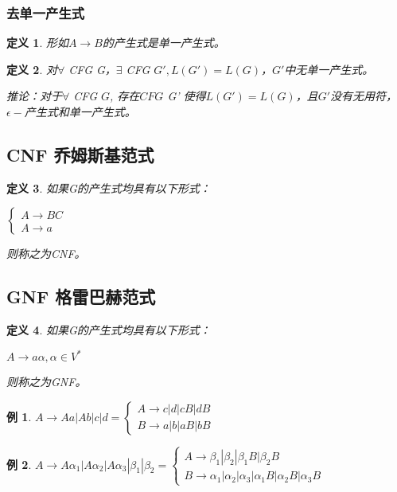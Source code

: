 \documentclass[twocolumn,zihao=5,linespread=1,heading=false,autoindent=0pt]{ctexart}
\theoremstyle{exampstyle} \newtheorem{definition}{定义}[section]
\theoremstyle{exampstyle} \newtheorem{example}{例}[section]
\theoremstyle{exampstyle} \newtheorem{theorem}{定理}[section]
\theoremstyle{exampstyle} \newtheorem{lemma}{引理}[section]
\theoremstyle{exampstyle} \newtheorem{myproof}{证明}[section]
\begin{document}
\subsubsection{去单一产生式}
\begin{definition}
    形如$A \to B$的产生式是单一产生式。
\end{definition}
\begin{definition}
    对$\forall$ CFG G，$\exists$ CFG $G', L(G') = L(G)$，$G'$中无单一产生式。

    推论：对于$\forall$ CFG $G$, 存在$CFG$ G' 使得$L(G') = L(G)$，且$G'$没有无用符，$\epsilon -$产生式和单一产生式。
\end{definition}

\subsection{CNF 乔姆斯基范式}
\begin{definition}
    如果G的产生式均具有以下形式：
    
    $
    \begin{cases}
        A \to BC \\
        A \to a
    \end{cases}
    $

    则称之为CNF。
\end{definition}
\subsection{GNF 格雷巴赫范式}
\begin{definition}
    如果G的产生式均具有以下形式：
    
    $
        A \to a\alpha, \alpha \in V^*
    $

    则称之为GNF。
\end{definition}

\begin{example}
    $A \to Aa | Ab | c | d = \begin{cases}
        A \to c | d | cB | dB \\
        B \to a | b | aB | bB
    \end{cases}$
\end{example}
\begin{example}
    $
        A \to  A\alpha_1 | A\alpha_2 | A\alpha_3 | \beta_1 | \beta_2 
        = \begin{cases}
            A \to \beta_1 | \beta_2 | \beta_1B | \beta_2B \\
            B \to \alpha_1 | \alpha_2  | \alpha_3 | \alpha_1B | \alpha_2B | \alpha_3B
        \end{cases}
    $
\end{example}
\end{document}
